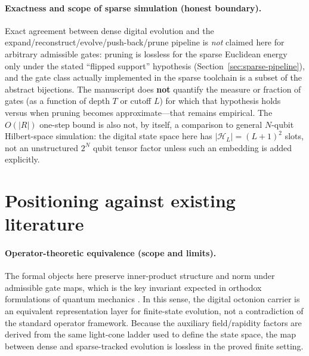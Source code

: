 \documentclass[11pt,a4paper]{article}
\theoremstyle{remark}
\begin{document}
\paragraph{Exactness and scope of sparse simulation (honest boundary).}
Exact agreement between dense digital evolution and the expand/reconstruct/evolve/push-back/prune pipeline is \emph{not} claimed here for arbitrary admissible gates: pruning is lossless for the sparse Euclidean energy only under the stated ``flipped support'' hypothesis (Section~\ref{sec:sparse-pipeline}), and the gate class actually implemented in the sparse toolchain is a subset of the abstract bijections. The manuscript does \textbf{not} quantify the measure or fraction of gates (as a function of depth $T$ or cutoff $L$) for which that hypothesis holds versus when pruning becomes approximate---that remains empirical. The $O(|R|)$ one-step bound is also not, by itself, a comparison to general $N$-qubit Hilbert-space simulation: the digital state space here has $|\mathcal{H}_L|=(L+1)^2$ slots, not an unstructured $2^N$ qubit tensor factor unless such an embedding is added explicitly.

\section{Positioning against existing literature}

\paragraph{Operator-theoretic equivalence (scope and limits).}
The formal objects here preserve inner-product structure and norm under admissible gate maps, which is the key invariant expected in orthodox formulations of quantum mechanics \cite{vonNeumann1955,dirac1930}. In this sense, the digital octonion carrier is an equivalent representation layer for finite-state evolution, not a contradiction of the standard operator framework. Because the auxiliary field/rapidity factors are derived from the same light-cone ladder used to define the state space, the map between dense and sparse-tracked evolution is lossless in the proved finite setting.
\end{document}
